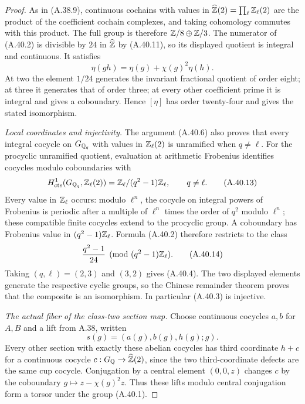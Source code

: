 \begin{proof}
As in (A.38.9), continuous cochains with values in
$\widehat{\mathbb Z}(2)=\prod_\ell\mathbb Z_\ell(2)$ are the product of the
coefficient cochain complexes, and taking cohomology commutes
with this product.  The full group is therefore
$\mathbb Z/8\oplus\mathbb Z/3$.  The numerator of (A.40.2) is divisible by
$24$ in $\widehat{\mathbb Z}$ by (A.40.11), so its displayed quotient
is integral and continuous.  It satisfies
\[
        \eta(gh)=\eta(g)+\chi(g)^2\eta(h).
\]
At two the element $1/24$ generates the invariant fractional
quotient of order eight; at three it generates that of order
three; at every other coefficient prime it is integral and
gives a coboundary.  Hence $[\eta]$ has order twenty-four and
gives the stated isomorphism.

\emph{Local coordinates and injectivity.}
The argument (A.40.6) also proves that every integral cocycle
on $G_{\mathbb Q_q}$ with values in $\mathbb Z_\ell(2)$ is unramified when
$q\ne\ell$.  For the procyclic unramified quotient, evaluation
at arithmetic Frobenius identifies cocycles modulo coboundaries
with
\[
        H^1_{\rm cts}(G_{\mathbb Q_q},\mathbb Z_\ell(2))
                =\mathbb Z_\ell/(q^2-1)\mathbb Z_\ell,\qquad q\ne\ell.
 \tag{A.40.13}
\]
Every value in $\mathbb Z_\ell$ occurs: modulo $\ell^n$, the cocycle
on integral powers of Frobenius is periodic after a multiple of
$\ell^n$ times the order of $q^2$ modulo $\ell^n$; these
compatible finite cocycles extend to the procyclic group.  A
coboundary has Frobenius value in $(q^2-1)\mathbb Z_\ell$.
Formula (A.40.2) therefore restricts to the class
\[
                       \frac{q^2-1}{24}
             \pmod{(q^2-1)\mathbb Z_\ell}.
 \tag{A.40.14}
\]
Taking $(q,\ell)=(2,3)$ and $(3,2)$ gives (A.40.4).
The two displayed elements generate the respective cyclic
groups, so the Chinese remainder theorem proves that the
composite is an isomorphism.  In particular (A.40.3) is
injective.

\emph{The actual fiber of the class-two section map.}
Choose continuous cocycles $a,b$ for $A,B$ and a lift from
A.38, written
\[
                   s(g)=(a(g),b(g),h(g);g).
\]
Every other section with exactly these abelian cocycles has
third coordinate $h+c$ for a continuous cocycle
$c:G_\mathbb Q\to\widehat{\mathbb Z}(2)$, since the two third-coordinate
defects are the same cup cocycle.  Conjugation by a central
element $(0,0,z)$ changes $c$ by the coboundary
$g\mapsto z-\chi(g)^2z$.  Thus these lifts modulo central
conjugation form a torsor under the group (A.40.1).


\end{proof}
